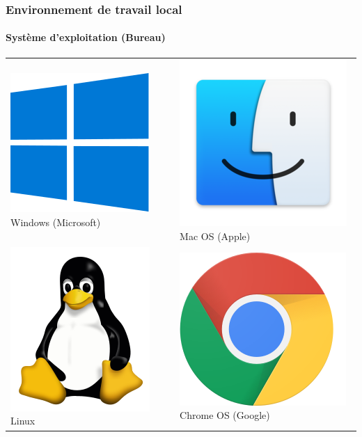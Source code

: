 \documentclass[xcolor=table]{beamer}
\begin{document}
\begin{frame}
\frametitle{Environnement de travail local}
\framesubtitle{Système d'exploitation (Bureau)}

\begin{tabular}{ll}
	\includegraphics[height=.25\textheight]{..//img/Bweb01-environnement/windows.png} 
	Windows (Microsoft) &
	\includegraphics[height=.25\textheight]{..//img/Bweb01-environnement/mac-finder.png} 
	Mac OS (Apple) \\
	
	\includegraphics[height=.25\textheight]{..//img/Bweb01-environnement/tux.png} 
	Linux &
	\includegraphics[height=.25\textheight]{..//img/Bweb01-environnement/chrome.png} 
	Chrome OS (Google) \\
	

\end{tabular}
\end{frame}
\end{document}
